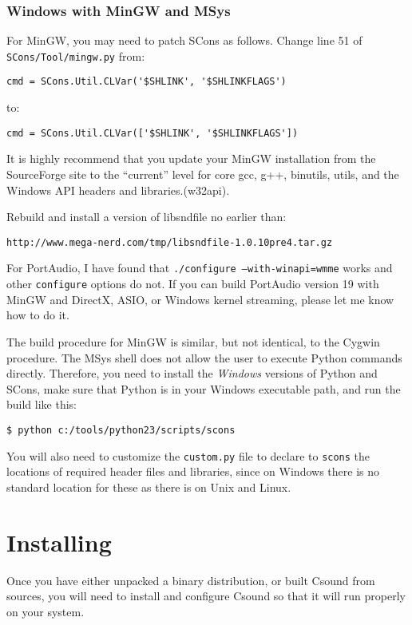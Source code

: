 \documentclass[10pt,letterpaper,onecolumn]{ltxguide}
\begin{document}
\subsubsection{Windows with MinGW and MSys}

For MinGW, you may need to patch SCons as follows. Change line 51 of \texttt{SCons/Tool/mingw.py} from:
\begin{verbatim}
cmd = SCons.Util.CLVar('$SHLINK', '$SHLINKFLAGS')
\end{verbatim}
to:
\begin{verbatim}
cmd = SCons.Util.CLVar(['$SHLINK', '$SHLINKFLAGS']) 
\end{verbatim}

It is highly recommend that you update your MinGW installation from the SourceForge site to the ``current'' level for core gcc, g++, binutils,  utils, and the Windows API headers and libraries.(w32api).

Rebuild and install a version of libsndfile no earlier than:
\begin{verbatim}
http://www.mega-nerd.com/tmp/libsndfile-1.0.10pre4.tar.gz
\end{verbatim}

For PortAudio, I have found that \texttt{./configure ---with-winapi=wmme} works and other \texttt{configure} options do not. If you can build PortAudio version 19 with MinGW and DirectX, ASIO, or Windows kernel streaming, please let me know how to do it.

The build procedure for MinGW is similar, but not identical, to the Cygwin procedure. The MSys shell does not allow the user to execute Python commands directly. Therefore, you need to install the \emph{Windows} versions of Python and SCons, make sure that Python is in your Windows executable path, and run the build like this:
\begin{verbatim}
$ python c:/tools/python23/scripts/scons
\end{verbatim}

You will also need to customize the \texttt{custom.py} file to declare to \texttt{scons} the locations of required header files and libraries, since on Windows there is no standard location for these as there is on Unix and Linux.

\section{Installing}

Once you have either unpacked a binary distribution, or built Csound from sources, you will need to install and configure Csound so that it will run properly on your system. 
\end{document}
